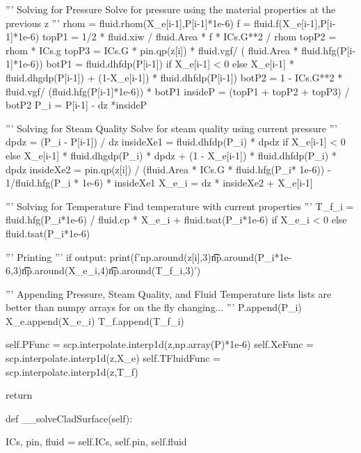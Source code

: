 \documentclass{article}
\begin{document}
\begin{python}
            '''
            Solving for Pressure
            Solve for pressure using the material properties at the previous z
            '''
            rhom = fluid.rhom(X_e[i-1],P[i-1]*1e-6)
            f = fluid.f(X_e[i-1],P[i-1]*1e-6)
            topP1 = 1/2 * fluid.xiw / fluid.Area * f * ICs.G**2 / rhom
            topP2 = rhom * ICs.g
            topP3 = ICs.G * pin.qp(z[i]) * fluid.vgf/ ( fluid.Area * fluid.hfg(P[i-1]*1e-6))
            botP1 =  fluid.dhfdp(P[i-1]) if X_e[i-1] < 0 else X_e[i-1] * fluid.dhgdp(P[i-1]) + (1-X_e[i-1]) * fluid.dhfdp(P[i-1])
            botP2 = 1 - ICs.G**2 * fluid.vgf/ (fluid.hfg(P[i-1]*1e-6)) * botP1
            insideP = (topP1 + topP2 + topP3) / botP2
            P_i = P[i-1] - dz *insideP

            '''
            Solving for Steam Quality
            Solve for steam quality using current pressure
            '''
            dpdz = (P_i - P[i-1]) / dz
            insideXe1 = fluid.dhfdp(P_i) * dpdz if X_e[i-1] < 0 else X_e[i-1] * fluid.dhgdp(P_i) * dpdz + (1 - X_e[i-1]) * fluid.dhfdp(P_i) * dpdz
            insideXe2 = pin.qp(z[i]) / (fluid.Area * ICs.G * fluid.hfg(P_i* 1e-6)) - 1/fluid.hfg(P_i * 1e-6) * insideXe1
            X_e_i = dz * insideXe2 + X_e[i-1]

            '''
            Solving for Temperature
            Find temperature with current properties
            '''
            T_f_i = fluid.hfg(P_i*1e-6) / fluid.cp * X_e_i + fluid.tsat(P_i*1e-6) if X_e_i < 0 else fluid.tsat(P_i*1e-6)

            '''
            Printing
            '''
            if output:
                print(f'{np.around(z[i],3)}\t\t{np.around(P_i*1e-6,3)}\t\t{np.around(X_e_i,4)}\t\t{np.around(T_f_i,3)}')
            
            '''
            Appending Pressure, Steam Quality, and Fluid Temperature lists
            lists are better than numpy arrays for on the fly changing...
            '''
            P.append(P_i)
            X_e.append(X_e_i)
            T_f.append(T_f_i)
            
        
        self.PFunc = scp.interpolate.interp1d(z,np.array(P)*1e-6)
        self.XeFunc = scp.interpolate.interp1d(z,X_e)
        self.TFluidFunc = scp.interpolate.interp1d(z,T_f)
        
        return


    def __solveCladSurface(self):

        ICs, pin, fluid = self.ICs, self.pin, self.fluid


\end{python}
\end{document}

